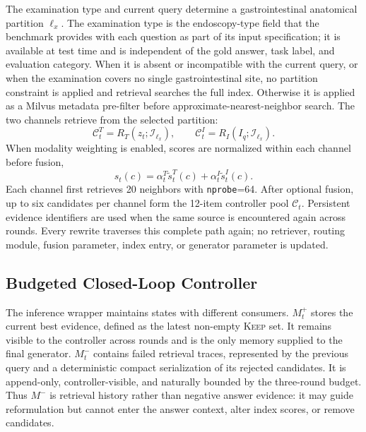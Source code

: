 The examination type and current query determine a gastrointestinal
anatomical partition $\ell_x$. The examination type is the endoscopy-type field
that the benchmark provides with each question as part of its input
specification; it is available at test time and is independent of the gold
answer, task label, and evaluation category. When it is absent or incompatible
with the current query, or when the examination covers no single
gastrointestinal site, no partition constraint is applied and retrieval
searches the full index. Otherwise it is applied as a Milvus metadata
pre-filter before approximate-nearest-neighbor search. The two channels
retrieve from the selected partition:
\begin{equation}
 \mathcal{C}_t^T=R_T(z_t;\mathcal{I}_{\ell_x}),\qquad
 \mathcal{C}_t^I=R_I(I_q;\mathcal{I}_{\ell_x}).
 \label{eq:dual-retrieval}
\end{equation}
When modality weighting is enabled, scores are normalized within each channel
before fusion,
\begin{equation}
 s_t(c)=\alpha_t^T\widetilde{s}_t^T(c)
       +\alpha_t^I\widetilde{s}_t^I(c).
 \label{eq:fusion}
\end{equation}
Each channel first retrieves 20 neighbors with \texttt{nprobe}=64. After
optional fusion, up to six candidates per channel form the 12-item controller
pool $\mathcal{C}_t$. Persistent evidence identifiers are used when
the same source is encountered again across rounds. Every rewrite traverses
this complete path again; no retriever, routing module, fusion parameter,
index entry, or generator parameter is updated.

\subsection{Budgeted Closed-Loop Controller}
\label{sec:controller}

The inference wrapper maintains states with different consumers. $M_t^+$
stores the current best evidence, defined as the latest non-empty
\textsc{Keep} set. It remains visible to the controller across rounds and is
the only memory supplied to the final generator. $M_t^-$ contains failed
retrieval traces, represented by the previous query and a deterministic compact
serialization of its rejected candidates. It is append-only, controller-visible,
and naturally bounded by the three-round budget. Thus $M^-$ is retrieval
history rather than negative answer evidence: it may guide reformulation but
cannot enter the answer context, alter index scores, or remove candidates.

